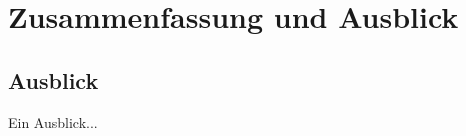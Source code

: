 \chapter{Zusammenfassung und Ausblick}
\label{sec:ZusammenfassungUndAusblick}

\blindtext

\section{Ausblick}
\label{sec:Ausblick}

Ein Ausblick...

\blindtext
